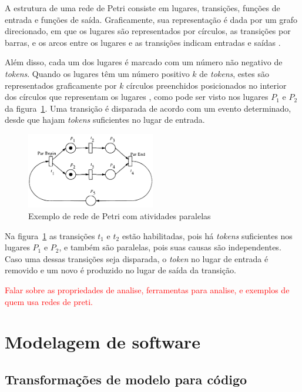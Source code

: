 A estrutura de uma rede de Petri consiste em lugares, transições, funções de entrada e funções de saída. Graficamente, sua representação é dada por um grafo direcionado, em que os lugares são representados por círculos, as transições por barras, e os arcos entre os lugares e as transições indicam entradas e saídas \cite{peterson:1981}. %

Além disso, cada um dos lugares é marcado com um número não negativo de \textit{tokens}. Quando os lugares têm um número positivo $k$ de \textit{tokens}, estes são representados graficamente por $k$ círculos preenchidos posicionados no interior dos círculos que representam os lugares \cite{murata:1989}, como pode ser visto nos lugares $P_1$ e $P_2$ da figura~\ref{fig:petrinet}. Uma transição é disparada de acordo com um evento determinado, desde que hajam \textit{tokens} suficientes no lugar de entrada.

\begin{figure}[h]
	\caption{\label{fig:petrinet}Exemplo de rede de Petri com atividades paralelas}
	\begin{center}
	    \includegraphics[width=0.5\textwidth]{resources/petri_net_murata_1}
	\end{center}
\end{figure}

Na figura~\ref{fig:petrinet} as transições $t_1$ e $t_2$ estão habilitadas, pois há \textit{tokens} suficientes nos lugares $P_1$ e $P_2$, e também são paralelas, pois suas causas são independentes. Caso uma dessas transições seja disparada, o \textit{token} no lugar de entrada é removido e um novo é produzido no lugar de saída da transição.

\textcolor{red}{Falar sobre as propriedades de analise, ferramentas para analise, e exemplos de quem usa redes de preti.}

\section{Modelagem de software}
\label{sec:modelagem}
\subsection{Transformações de modelo para código}